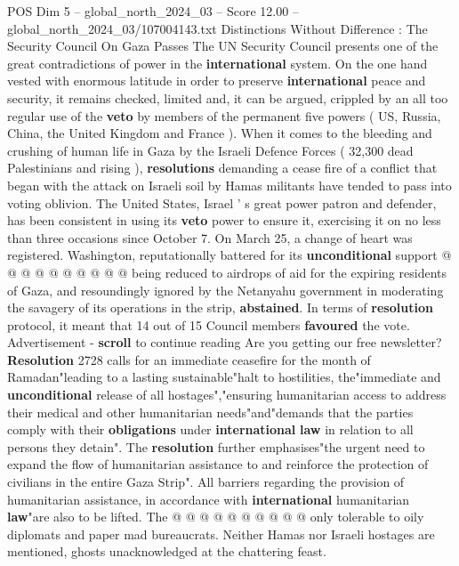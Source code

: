 \begin{textsample}{POS Dim 5 – global\_north\_2024\_03 – Score 12.00 – global\_north\_2024\_03/107004143.txt}  \label{ex:f5_pos_300}
Distinctions Without Difference : The Security Council On Gaza Passes The UN Security Council presents one of the great contradictions of power in the \textbf{international} system.
On the one hand vested with enormous latitude in order to preserve \textbf{international} peace and security, it remains checked, limited and, it can be argued, crippled by an all too regular use of the \textbf{veto} by members of the permanent five powers ( US, Russia, China, the United Kingdom and France ).
When it comes to the bleeding and crushing of human life in Gaza by the Israeli Defence Forces ( 32,300 dead Palestinians and rising ), \textbf{resolutions} demanding a cease fire of a conflict that began with the attack on Israeli soil by Hamas militants have tended to pass into voting oblivion.
The United States, Israel ' s great power patron and defender, has been consistent in using its \textbf{veto} power to ensure it, exercising it on no less than three occasions since October 7.
On March 25, a change of heart was registered.
Washington, reputationally battered for its \textbf{unconditional} support @ @ @ @ @ @ @ @ @ @ being reduced to airdrops of aid for the expiring residents of Gaza, and resoundingly ignored by the Netanyahu government in moderating the savagery of its operations in the strip, \textbf{abstained}.
In terms of \textbf{resolution} protocol, it meant that 14 out of 15 Council members \textbf{favoured} the vote.
Advertisement - \textbf{scroll} to continue reading Are you getting our free newsletter? \textbf{Resolution} 2728 calls for an immediate ceasefire for the month of Ramadan"leading to a lasting sustainable"halt to hostilities, the"immediate and \textbf{unconditional} release of all hostages","ensuring humanitarian access to address their medical and other humanitarian needs"and"demands that the parties comply with their \textbf{obligations} under \textbf{international} \textbf{law} in relation to all persons they detain".
The \textbf{resolution} further emphasises"the urgent need to expand the flow of humanitarian assistance to and reinforce the protection of civilians in the entire Gaza Strip".
All barriers regarding the provision of humanitarian assistance, in accordance with \textbf{international} humanitarian \textbf{law}"are also to be lifted.
The @ @ @ @ @ @ @ @ @ @ only tolerable to oily diplomats and paper mad bureaucrats.
Neither Hamas nor Israeli hostages are mentioned, ghosts unacknowledged at the chattering feast.

\end{textsample}
